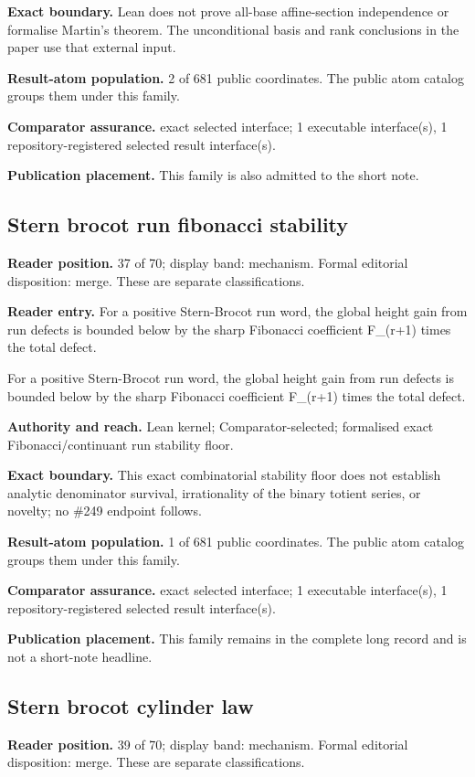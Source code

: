 \textbf{Exact boundary.} Lean does not prove all-base affine-section independence or formalise Martin's theorem. The unconditional basis and rank conclusions in the paper use that external input.

\textbf{Result-atom population.} 2 of 681 public coordinates. The public atom catalog groups them under this family.

\textbf{Comparator assurance.} exact selected interface; 1 executable interface(s), 1 repository-registered selected result interface(s).

\textbf{Publication placement.} This family is also admitted to the short note.

\subsection{Stern brocot run fibonacci stability}
\textbf{Reader position.} 37 of 70; display band: mechanism.  Formal editorial disposition: merge.  These are separate classifications.

\textbf{Reader entry.} For a positive Stern-Brocot run word, the global height gain from run defects is bounded below by the sharp Fibonacci coefficient F\_(r+1) times the total defect.

For a positive Stern-Brocot run word, the global height gain from run defects is bounded below by the sharp Fibonacci coefficient F\_(r+1) times the total defect.

\textbf{Authority and reach.} Lean kernel; Comparator-selected; formalised exact Fibonacci/continuant run stability floor.

\textbf{Exact boundary.} This exact combinatorial stability floor does not establish analytic denominator survival, irrationality of the binary totient series, or novelty; no \#249 endpoint follows.

\textbf{Result-atom population.} 1 of 681 public coordinates. The public atom catalog groups them under this family.

\textbf{Comparator assurance.} exact selected interface; 1 executable interface(s), 1 repository-registered selected result interface(s).

\textbf{Publication placement.} This family remains in the complete long record and is not a short-note headline.

\subsection{Stern brocot cylinder law}
\textbf{Reader position.} 39 of 70; display band: mechanism.  Formal editorial disposition: merge.  These are separate classifications.

